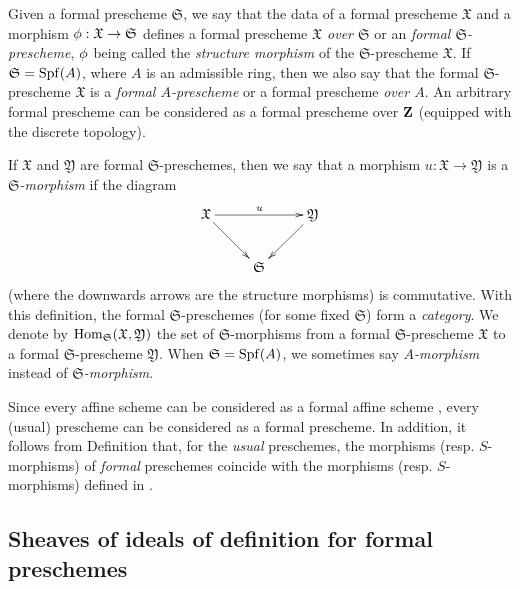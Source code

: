 \begin{env}[10.4.7]
\label{1.10.4.7}
Given a formal prescheme $\mathfrak{S}$, we say that the data of a formal prescheme $\mathfrak{X}$ and a morphism $\vphi:\mathfrak{X}\to\mathfrak{S}$ defines a formal prescheme \emph{$\mathfrak{X}$ over $\mathfrak{S}$} or an \emph{formal $\mathfrak{S}$-prescheme}, $\phi$ being called the \emph{structure morphism} of the $\mathfrak{S}$-prescheme $\mathfrak{X}$.
If $\mathfrak{S}=\operatorname{Spf}(A)$, where $A$ is an admissible ring, then we also say that the formal $\mathfrak{S}$-prescheme $\mathfrak{X}$ is a \emph{formal $A$-prescheme} or a formal prescheme \emph{over $A$}.
An arbitrary formal prescheme can be considered as a formal prescheme over $\mathbf{Z}$ (equipped with the discrete topology).

If $\mathfrak{X}$ and $\mathfrak{Y}$ are formal $\mathfrak{S}$-preschemes, then we say that a morphism $u:\mathfrak{X}\to\mathfrak{Y}$ is a \emph{$\mathfrak{S}$-morphism} if the diagram
\[
  \xymatrix{
    \mathfrak{X}\ar[rr]^u\ar[rd] & &
    \mathfrak{Y}\ar[ld]\\
    & \mathfrak{S}
  }
\]
(where the downwards arrows are the structure morphisms) is commutative.
With this definition, the formal $\mathfrak{S}$-preschemes (for some fixed $\mathfrak{S}$) form a \emph{category}.
We denote by $\operatorname{Hom}_\mathfrak{S}(\mathfrak{X},\mathfrak{Y})$ the set of $\mathfrak{S}$-morphisms from a formal $\mathfrak{S}$-prescheme $\mathfrak{X}$ to a formal $\mathfrak{S}$-prescheme $\mathfrak{Y}$.
When $\mathfrak{S}=\operatorname{Spf}(A)$, we sometimes say \emph{$A$-morphism} instead of \emph{$\mathfrak{S}$-morphism}.
\end{env}

\begin{env}[10.4.8]
\label{1.10.4.8}
Since every affine scheme can be considered as a formal affine scheme , every (usual) prescheme can be considered as a formal prescheme.
In addition, it follows from Definition  that, for the \emph{usual} preschemes, the morphisms (resp. $S$-morphisms) of \emph{formal} preschemes coincide with the morphisms (resp. $S$-morphisms) defined in .
\end{env}

\subsection{Sheaves of ideals of definition for formal preschemes}
\label{subsection:1.10.5}

